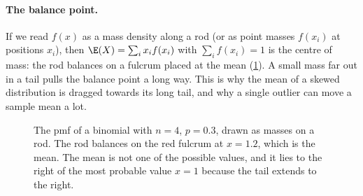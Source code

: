 \paragraph{The balance point.}
If we read $f(x)$ as a mass density along a rod (or as point masses $f(x_i)$
at positions $x_i$), then $\E(X)=\sum_ix_if(x_i)$ with $\sum_if(x_i)=1$ is the
centre of mass: the rod balances on a fulcrum placed at the mean
(\cref{1b:fig:balance}). A small mass far out in a tail pulls the balance
point a long way. This is why the mean of a skewed distribution is dragged
towards its long tail, and why a single outlier can move a sample mean a lot.

\begin{figure}[htbp]
\centering
{}
\caption{The pmf of a binomial with $n=4$, $p=0.3$, drawn as masses on a rod.
The rod balances on the red fulcrum at $x=1.2$, which is the mean. The mean is
not one of the possible values, and it lies to the right of the most probable
value $x=1$ because the tail extends to the right.}
\label{1b:fig:balance}
\end{figure}

